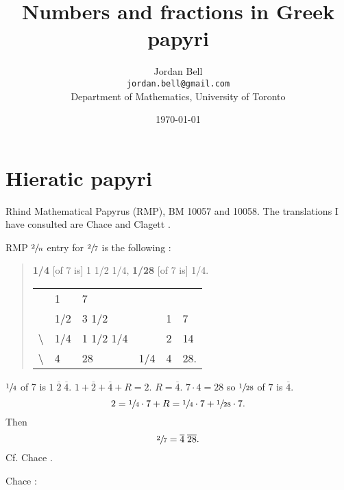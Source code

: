 \documentclass{article}
\theoremstyle{definition}
\begin{document}
\title{Numbers and fractions in Greek papyri}
\author{Jordan Bell\\ \texttt{jordan.bell@gmail.com}\\Department of Mathematics, University of Toronto}
\date{\today}
\maketitle


 
\section{Hieratic papyri}
Rhind Mathematical Papyrus (RMP), BM 10057 and 10058. The translations I have consulted are 
Chace \cite{chace} and Clagett \cite{egyptian3}.

RMP $\sfrac{2}{n}$ entry for 
$\sfrac{2}{7}$ is the following \cite[p.~122]{egyptian3}:

\begin{quote}
\textbf{1/4} [of 7 is] 1 1/2 1/4, \textbf{1/28} [of 7 is] 1/4.

\begin{tabular}{llllll}
&1&7&&&\\
&1/2&3 1/2&&1&7\\
\textbackslash&1/4&1 1/2 1/4&&2&14\\
\textbackslash&4&28&1/4&4&28.
\end{tabular}
\end{quote}

$\sfrac{1}{4}$ of 7  is  $1 \; \overline{2} \; \overline{4}$.
$1 + \overline{2} + \overline{4} + R = 2$. $R=\overline{4}$.
$7\cdot 4 = 28$ so $\sfrac{1}{28}$ of $7$ is $\overline{4}$.
\[
2 = \sfrac{1}{4} \cdot 7 + R = \sfrac{1}{4} \cdot 7 + \sfrac{1}{28} \cdot 7.
\]
Then
\[
\sfrac{2}{7} = \overline{4} \; \overline{28}.
\]
Cf. Chace \cite[pp.~14--15]{chace}.

Chace \cite[pp.~5--6]{chace}:
\end{document}
